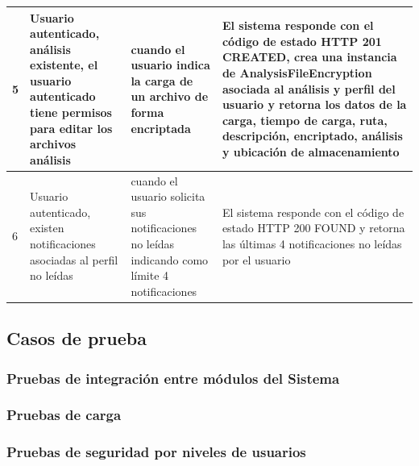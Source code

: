 \begin{center}
\begin{longtable}{|p{0.7cm}|p{4cm}|p{4cm}|p{5cm}| }
5& Usuario autenticado, análisis existente, el usuario autenticado tiene permisos para editar los archivos análisis & cuando el usuario indica la carga de un archivo de forma encriptada & El sistema responde con el código de estado HTTP 201 CREATED, crea una instancia de AnalysisFileEncryption asociada al análisis y perfil del usuario y retorna los datos de la carga, tiempo de carga, ruta, descripción, encriptado, análisis y ubicación de almacenamiento\\ \hline

6& Usuario autenticado, existen notificaciones asociadas al perfil no leídas & cuando el usuario solicita sus notificaciones no leídas indicando como límite 4 notificaciones & El sistema responde con el código de estado HTTP 200 FOUND y retorna las últimas 4 notificaciones no leídas por el usuario\\ \hline


  \end{longtable}
\end{center}


\subsection{Casos de prueba}

\subsubsection{Pruebas de integración  entre módulos del Sistema}

\subsubsection{Pruebas de carga}

\subsubsection{Pruebas de seguridad por niveles de usuarios}


